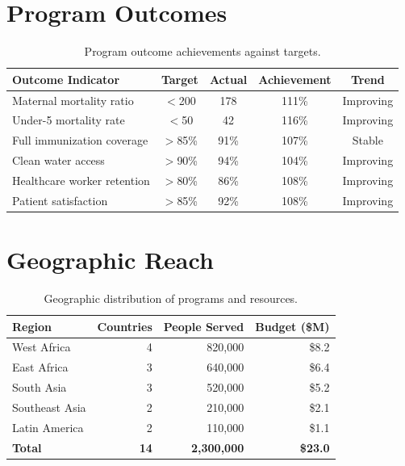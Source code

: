\documentclass[
    language=english,
    doctype=impact-report,
    institution=none,
]{../../omnilatex}
\begin{document}
\section{Program Outcomes}

\begin{table}[h]
    \centering
    \begin{tabular}{lcccc}
        \toprule
        \textbf{Outcome Indicator} & \textbf{Target} & \textbf{Actual} & \textbf{Achievement} & \textbf{Trend} \\
        \midrule
        Maternal mortality ratio & $<$200 & 178 & 111\% & Improving \\
        Under-5 mortality rate & $<$50 & 42 & 116\% & Improving \\
        Full immunization coverage & $>$85\% & 91\% & 107\% & Stable \\
        Clean water access & $>$90\% & 94\% & 104\% & Improving \\
        Healthcare worker retention & $>$80\% & 86\% & 108\% & Improving \\
        Patient satisfaction & $>$85\% & 92\% & 108\% & Improving \\
        \bottomrule
    \end{tabular}
    \caption{Program outcome achievements against targets.}
\end{table}

\section{Geographic Reach}

\begin{table}[h]
    \centering
    \begin{tabular}{lrrr}
        \toprule
        \textbf{Region} & \textbf{Countries} & \textbf{People Served} & \textbf{Budget (\$M)} \\
        \midrule
        West Africa & 4 & 820,000 & \$8.2 \\
        East Africa & 3 & 640,000 & \$6.4 \\
        South Asia & 3 & 520,000 & \$5.2 \\
        Southeast Asia & 2 & 210,000 & \$2.1 \\
        Latin America & 2 & 110,000 & \$1.1 \\
        \midrule
        \textbf{Total} & \textbf{14} & \textbf{2,300,000} & \textbf{\$23.0} \\
        \bottomrule
    \end{tabular}
    \caption{Geographic distribution of programs and resources.}
\end{table}
\end{document}
